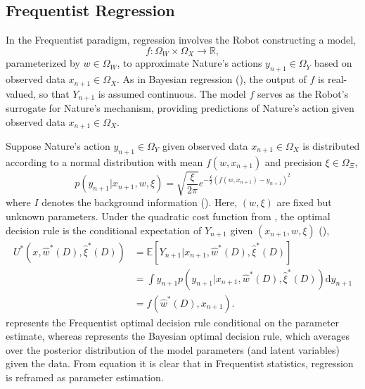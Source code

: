 \subsection{Frequentist Regression}
\label{chp:frequentist_regression}
In the Frequentist paradigm, regression involves the Robot constructing a model,
\begin{equation}
	f: \Omega_W \times \Omega_X \to \mathbb{R},
\end{equation}
parameterized by $w \in \Omega_W$, to approximate Nature's actions $y_{n+1}\in \Omega_Y$ based on observed data $x_{n+1}\in \Omega_X$. As in Bayesian regression (), the output of $f$ is real-valued, so that $Y_{n+1}$ is assumed continuous. The model $f$ serves as the Robot's surrogate for Nature's mechanism, providing predictions of Nature's action given observed data $x_{n+1} \in \Omega_X$. \newline

Suppose Nature's action $y_{n+1}\in\Omega_Y$ given observed data $x_{n+1}\in \Omega_X$ is distributed according to a normal distribution with mean $f(w,x_{n+1})$ and precision $\xi \in \Omega_{\Xi}$,
\begin{equation}
	p(y_{n+1} | x_{n+1}, w, \xi) 
	= \sqrt{\frac{\xi}{2\pi}} e^{-\frac{\xi}{2}(f(w,x_{n+1})-y_{n+1})^2}
	\label{freq:dist}
\end{equation}
where $I$ denotes the background information (). Here, $(w,\xi)$ are fixed but unknown parameters. Under the quadratic cost function from , the optimal decision rule is the conditional expectation of $Y_{n+1}$ given $(x_{n+1},w,\xi)$ (),
\begin{equation}
	\begin{split}
		U^*(x,\hat{w}^*(D),\hat{\xi}^*(D)) &= \mathbb{E}[Y_{n+1} | x_{n+1}, \hat{w}^*(D), \hat{\xi}^*(D)]\\
		&= \int y_{n+1} p(y_{n+1} | x_{n+1}, \hat{w}^*(D), \hat{\xi}^*(D)) \mathrm{d}y_{n+1}\\
		& = f(\hat{w}^*(D),x_{n+1}).
	\end{split}
	\label{freq:decision}
\end{equation}
 represents the Frequentist optimal decision rule conditional on the parameter estimate, whereas  represents the Bayesian optimal decision rule, which averages over the posterior distribution of the model parameters (and latent variables) given the data. From equation  it is clear that in Frequentist statistics, regression is reframed as parameter estimation.


